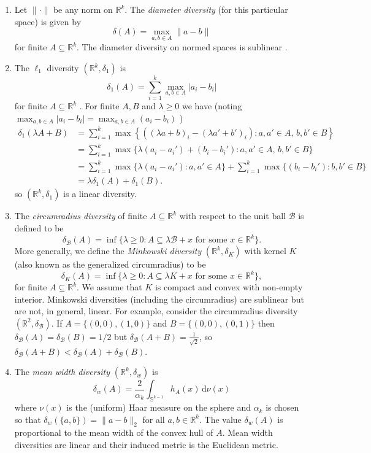 \documentclass[11pt]{article}
\newcommand{\bbS}{\mathbb{S}}
\newcommand{\conv}{\mathrm{conv}}
\renewcommand{\Re}{\mathbb{R}}
\newcommand{\sB}{\mathcal{B}}
\begin{document}
\begin{enumerate}
\item    Let $\| \cdot \|$ be any norm on $\Re^k$. The {\em diameter diversity} (for this particular space) is given by
    \[\delta(A) = \max_{a,b \in A} \|a-b\|\]
for  finite $A \subseteq \Re^k$. The diameter diversity on normed spaces is sublinear \cite[p. 49]{Schneider14}.
\item The $\ell_1$ diversity $(\Re^k,\delta_1)$ is 
\[
\delta_1(A) = \sum_{i=1}^k \max_{a,b \in A} |a_i - b_i| 
\]
for  finite $A\subseteq \Re^k$ \cite{BryantTupper14}. For finite $A,B$ and $\lambda \geq 0$ we have (noting $\max_{a,b \in A} |a_i - b_i| =\max_{a,b \in A} (a_i - b_i) $ )
\begin{align*}
\delta_1(\lambda A+B) & = \sum_{i=1}^k \max\left\{ \left((\lambda a+b)_i - (\lambda a' + b')_i\right):   a,a' \in A, \, b,b' \in B \right\} \\
& = \sum_{i=1}^k  \max\{\lambda(a_i - a_i') + (b_i - b_i') :  a,a' \in A, \, b,b' \in B \} \\
& =  \sum_{i=1}^k \max\{\lambda(a_i - a_i') : a,a' \in A \} +  \sum_{i=1}^k \max \{ (b_i - b_i') :   b,b' \in B \}  \\
& =\lambda \delta_1(A) + \delta_1(B).
\end{align*}
so $(\Re^k,\delta_1)$ is a linear diversity.
\item The {\em circumradius diversity} of finite $A \subseteq \Re^k$ 
with respect to the unit ball $\sB$ is  defined to be
\[\delta_\sB(A) = \inf\{\lambda  \geq 0: A \subseteq \lambda \sB + x \mbox{ for some $x \in \Re^k$} \}.
\]
More generally, we define the {\em Minkowski diversity} $(\Re^k,\delta_K)$ with kernel $K$ (also known as the generalized circumradius) to be  
\begin{equation} \label{eq:minkowski_defn}
\delta_K(A) = \inf \{\lambda \geq 0 : A \subseteq  \lambda K +x \mbox{ for some } x \in \Re^k\},
\end{equation}
for finite $A \subseteq \Re^k$. We assume that $K$ is compact and convex with non-empty interior.  Minkowski diversities (including the circumradius) are sublinear \cite{bryant2023diversities} but are not, in general, linear. For example, consider the circumradius diversity  $(\Re^2,\delta_\sB)$. If $A = \{(0,0),(1,0)\}$ and $B = \{(0,0),(0,1)\}$ then $\delta_\sB(A) = \delta_\sB(B) = 1/2$ but $\delta_{\sB}(A+B) = \frac{1}{\sqrt{2}}$, so $\delta_\sB(A+B) < \delta_\sB(A) + \delta_\sB(B)$. 
\item The {\em mean width diversity} $(\Re^k,\delta_w)$ \cite{BryantTupper14} is 
\[\delta_w(A) = %
\frac{2}{\alpha_k} \int_{\bbS^{k-1}} h_A(x) \, \mathrm{d} \nu(x) \]
where $\nu(x)$ is the (uniform) Haar measure on the sphere and %
$\alpha_k$ is chosen so that $\delta_w(\{a,b\}) = \|a-b\|_2$ for all $a,b \in \Re^k$.
The value $\delta_w(A)$ is proportional to the mean width of the convex hull of $A$.  Mean width diversities are linear \cite[p. 50]{Schneider14} and 
their induced metric is the Euclidean metric. 


\end{enumerate}
\end{document}
